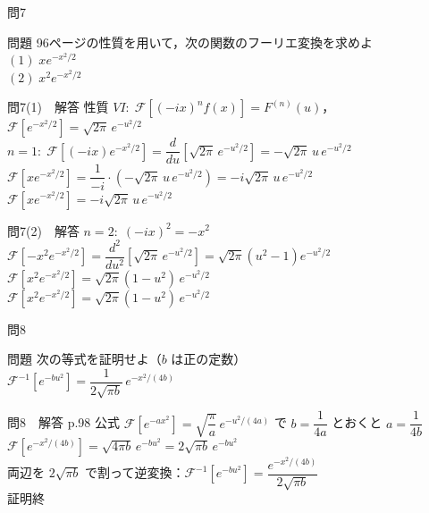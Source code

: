 \documentclass[professionalfonts]{beamer}
\begin{document}
\begin{frame}{問7　}
  \begin{exampleblock}{問題}
    96ページの性質を用いて，次の関数のフーリエ変換を求めよ\\[6pt]
    $(1)\; xe^{-x^{2}/2}$\\[4pt]
    $(2)\; x^{2}e^{-x^{2}/2}$
  \end{exampleblock}
\end{frame}

\begin{frame}{問7(1)　解答}
  性質 $VI:\; \mathcal{F}[(-ix)^{n}f(x)] = F^{(n)}(u)$，$\mathcal{F}[e^{-x^{2}/2}] = \sqrt{2\pi}\,e^{-u^{2}/2}$\\[6pt]
  $n=1:\; \mathcal{F}[(-ix)e^{-x^{2}/2}] = \dfrac{d}{du}\!\left[\sqrt{2\pi}\,e^{-u^{2}/2}\right] = -\sqrt{2\pi}\,u\,e^{-u^{2}/2}$\\[6pt]
  $\mathcal{F}[xe^{-x^{2}/2}] = \dfrac{1}{-i}\cdot(-\sqrt{2\pi}\,u\,e^{-u^{2}/2}) = -i\sqrt{2\pi}\,u\,e^{-u^{2}/2}$
  \\[8pt]\hfill $\mathcal{F}[xe^{-x^{2}/2}] = -i\sqrt{2\pi}\,u\,e^{-u^{2}/2}$
\end{frame}

\begin{frame}{問7(2)　解答}
  $n=2:\; (-ix)^{2} = -x^{2}$\\[6pt]
  $\mathcal{F}[-x^{2}e^{-x^{2}/2}] = \dfrac{d^{2}}{du^{2}}\!\left[\sqrt{2\pi}\,e^{-u^{2}/2}\right] = \sqrt{2\pi}(u^{2}-1)e^{-u^{2}/2}$\\[6pt]
  $\mathcal{F}[x^{2}e^{-x^{2}/2}] = \sqrt{2\pi}(1-u^{2})\,e^{-u^{2}/2}$
  \\[8pt]\hfill $\mathcal{F}[x^{2}e^{-x^{2}/2}] = \sqrt{2\pi}(1-u^{2})\,e^{-u^{2}/2}$
\end{frame}

\begin{frame}{問8　}
  \begin{exampleblock}{問題}
    次の等式を証明せよ（$b$ は正の定数）\\[6pt]
    $\mathcal{F}^{-1}[e^{-bu^{2}}] = \dfrac{1}{2\sqrt{\pi b}}\,e^{-x^{2}/(4b)}$
  \end{exampleblock}
\end{frame}

\begin{frame}{問8　解答}
  p.98 公式 $\mathcal{F}[e^{-ax^{2}}] = \sqrt{\dfrac{\pi}{a}}\,e^{-u^{2}/(4a)}$ で $b = \dfrac{1}{4a}$ とおくと $a = \dfrac{1}{4b}$\\[6pt]
  $\mathcal{F}[e^{-x^{2}/(4b)}] = \sqrt{4\pi b}\,e^{-bu^{2}} = 2\sqrt{\pi b}\,e^{-bu^{2}}$\\[6pt]
  両辺を $2\sqrt{\pi b}$ で割って逆変換：$\mathcal{F}^{-1}[e^{-bu^{2}}] = \dfrac{e^{-x^{2}/(4b)}}{2\sqrt{\pi b}}$
  \\[8pt]\hfill 証明終
\end{frame}
\end{document}
